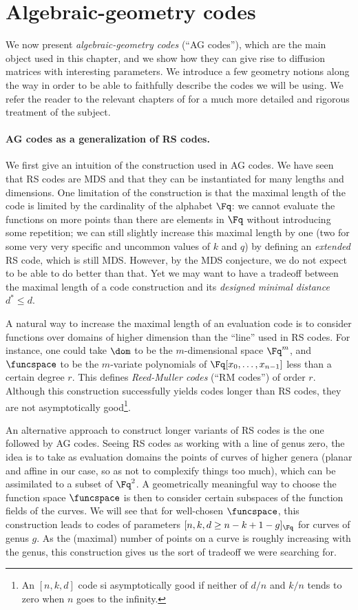\section{Algebraic-geometry codes}
\label{sec:ag}

We now present \emph{algebraic-geometry codes} (``AG codes''), which are the main object used in this chapter,
and we show how they can give rise to diffusion matrices with interesting parameters.
We introduce a few geometry notions along the way in order to be able to faithfully describe the codes we will
be using. 
We refer the reader to the relevant chapters of \cite{vanlint,tvn,stichtenoth,fulton} for a much more detailed and rigorous treatment of the subject. 

\paragraph{AG codes as a generalization of RS codes.}
We first give an intuition of the construction used in AG codes. We have seen that RS codes are MDS
and that they can be instantiated for many lengths and dimensions. One limitation of the construction
is that the maximal length of the code is limited by the cardinality of the alphabet $\Fq$: we
cannot evaluate the functions on more points than there are elements in $\Fq$ without introducing some
repetition; we can still slightly increase this maximal length by one (two for some
very very specific and uncommon values of $k$ and $q$) by defining an \emph{extended} RS code, which is still MDS. However, by the MDS
conjecture, we do not expect to be able to do better than that.
Yet we may want to
have a tradeoff between the maximal length of a code construction and its \emph{designed minimal distance} $d^* \leq d$.

A natural way to increase the maximal length of an evaluation code is to consider functions over domains
of higher dimension than the ``line'' used in RS codes. For instance, one could take $\dom$ to be the
$m$-dimensional space $\Fq^m$, and $\funcspace$ to be the $m$-variate polynomials of $\Fq[x_0,\ldots,x_{n-1}]$
less than a certain degree $r$. This defines \emph{Reed-Muller codes} (``RM codes'') of order $r$.
Although this construction successfully yields codes longer than RS codes, they are not asymptotically good\footnote{An
$[n, k, d]$ code si asymptotically good if neither of $d/n$ and $k/n$ tends to zero when $n$ goes to the infinity.}.

An alternative approach to construct longer variants of RS codes is the one followed by AG codes. Seeing
RS codes as working with a line of genus zero, the idea is to take as evaluation domains
the points of curves of higher genera (planar and affine in our case, so as not to complexify things too much),
which can be assimilated to a subset of $\Fq^2$. A geometrically
meaningful way to choose the function space $\funcspace$ is then to consider certain subspaces of
the function fields of the curves. We will see that for well-chosen $\funcspace$, this construction
leads to codes of parameters $[n, k, d \geq n - k + 1 - g]_{\Fq}$ for curves of genus $g$. As the
(maximal) number of points on a curve is roughly increasing with the genus, this construction gives us the
sort of tradeoff we were searching for.

